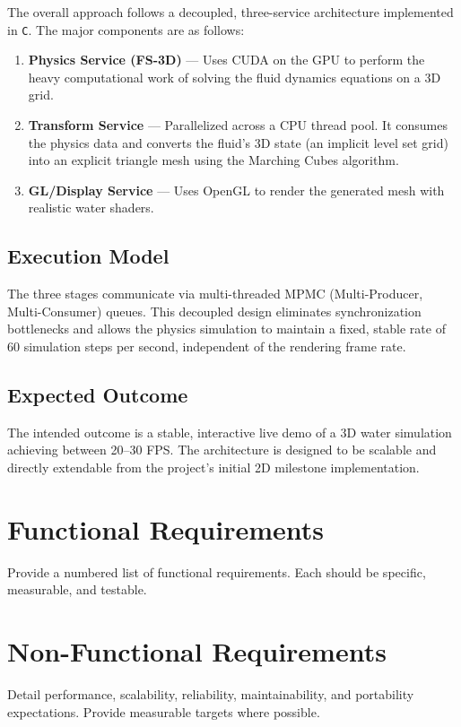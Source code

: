 \documentclass[12pt]{article}
\begin{document}
The overall approach follows a decoupled, three-service architecture implemented in \texttt{C}. The major components are as follows:

\begin{enumerate}
    \item \textbf{Physics Service (FS-3D)} — Uses CUDA on the GPU to perform the heavy computational work of solving the fluid dynamics equations on a 3D grid.
    \item \textbf{Transform Service} — Parallelized across a CPU thread pool. It consumes the physics data and converts the fluid’s 3D state (an implicit level set grid) into an explicit triangle mesh using the Marching Cubes algorithm.
    \item \textbf{GL/Display Service} — Uses OpenGL to render the generated mesh with realistic water shaders.
\end{enumerate}

\subsection{Execution Model}

The three stages communicate via multi-threaded MPMC (Multi-Producer, Multi-Consumer) queues. This decoupled design eliminates synchronization bottlenecks and allows the physics simulation to maintain a fixed, stable rate of 60 simulation steps per second, independent of the rendering frame rate.

\subsection{Expected Outcome}

The intended outcome is a stable, interactive live demo of a 3D water simulation achieving between 20–30 FPS. The architecture is designed to be scalable and directly extendable from the project’s initial 2D milestone implementation.

\section{Functional Requirements}
Provide a numbered list of functional requirements. Each should be specific, measurable, and testable.

\section{Non-Functional Requirements}
Detail performance, scalability, reliability, maintainability, and portability expectations. Provide measurable targets where possible.
\end{document}
